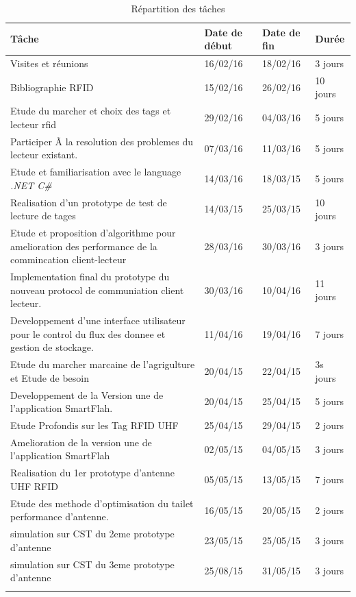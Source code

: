 \documentclass[11pt, a4paper, twoside]{book}
\begin{document}
\begin{longtable}{|p{}|p{}|p{}| p{}|}
\hline
\textbf{Tâche} & \textbf{Date de début} & \textbf{Date de fin} & \textbf{Durée} \\
\hline
Visites et réunions & 16/02/16 & 18/02/16 & 3 jours \\
\hline
Bibliographie RFID & 15/02/16 & 26/02/16 & 10 jours \\
\hline
Etude du marcher et choix des tags et lecteur rfid & 29/02/16 & 04/03/16 & 5 jours \\
\hline
Participer Ã  la resolution des problemes du lecteur existant.
 & 07/03/16 & 11/03/16 & 5 jours \\
\hline
Etude et familiarisation avec le language \emph{.NET C\#} & 14/03/16 & 18/03/15 & 5 jours \\
\hline
Realisation d'un prototype de test de lecture de tages & 14/03/15 & 25/03/15 & 10 jours \\
\hline
 Etude et proposition d'algorithme pour amelioration des performance de la commincation client-lecteur
 & 28/03/16 & 30/03/16 & 3 jours \\
\hline
Implementation final du prototype du nouveau protocol de communiation client lecteur.
 & 30/03/16 & 10/04/16 & 11 jours \\
\hline
Developpement d'une interface utilisateur pour le control du flux des donnee et gestion de stockage.
 & 11/04/16 & 19/04/16 & 7 jours \\
\hline
Etude du marcher marcaine de l'agrigulture et Etude de besoin & 20/04/15 & 22/04/15 & 3s jours \\
\hline
Developpement de la Version une de l'application SmartFlah. & 20/04/15 & 25/04/15 & 5 jours \\
\hline
Etude Profondis sur les Tag RFID UHF  & 25/04/15 & 29/04/15 & 2 jours \\
\hline
Amelioration de la version une de l'application SmartFlah & 02/05/15 & 04/05/15 & 3 jours \\
\hline
Realisation du 1er prototype d'antenne UHF RFID & 05/05/15 & 13/05/15 & 7 jours \\
\hline
Etude des methode d'optimisation du tailet performance d'antenne. & 16/05/15 & 20/05/15 & 2 jours \\
\hline
simulation sur CST du 2eme prototype d'antenne & 23/05/15 & 25/05/15 & 3 jours \\
\hline
simulation sur CST du 3eme prototype d'antenne & 25/08/15 & 31/05/15 & 3 jours \\
\hline
\caption{Répartition des tâches}
\end{longtable}
\end{document}
